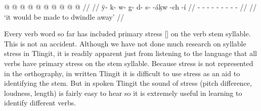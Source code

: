 \ex\label{ex:root+stem-ha-suffix+suffix}%
%
\begingl
	\gla	{} @ {} @ {} @ {} @ {} @ {} @ {} @ {} @ {} @ {} @ {} //
	\glp	\llap{[}\rlap{\ipa{jà.kʷʰùː.qàs.ˈ\gm{héː}.jáqʷ.tʃì}]} {} {} {} {} {} {} {} {} {} {} //
	\glb	ÿ- k- w- g̱- d- s-   -áḵw -ch -í //
	\glc	\xx{qual}- - - - - - 
			 - - - //
	\gld	{} {} {} {} {} {} {} {} {} {} {} //
	\glft	‘it would be made to dwindle away’
		//
\endgl
\xe

Every verb word so far has included primary stress [] on the verb stem syllable. This is not an accident. Although we have not done much research on syllable stress in Tlingit, it is readily apparent just from listening to the language that all verbs have primary stress on the stem syllable. Because stress is not represented in the orthography, in written Tlingit it is difficult to use stress as an aid to identifying the stem. But in spoken Tlingit the sound of stress (pitch difference, loudness, length) is fairly easy to hear so it is extremely useful in learning to identify different verbs.

\stopcontents[chapters]